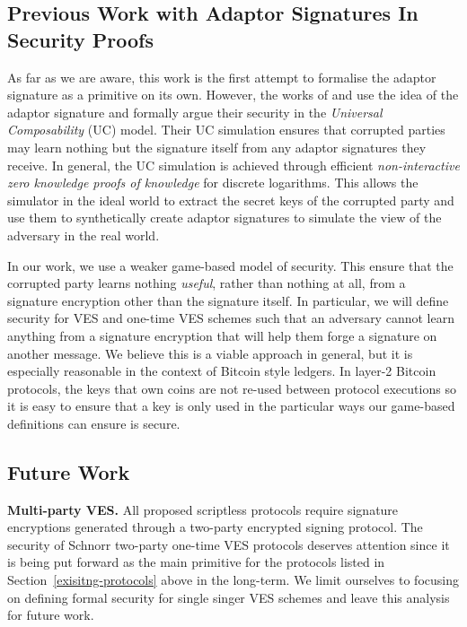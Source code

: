 \documentclass[fullpage]{article}
\theoremstyle{definition}
\begin{document}
\subsection{Previous Work with Adaptor Signatures In Security Proofs}

As far as we are aware, this work is the first attempt to formalise the adaptor signature as a primitive on its own. However, the works of \cite{cryptoeprint:2018:472} and \cite{cryptoeprint:2019:589} use the idea of the adaptor signature and formally argue their security in the \emph{Universal Composability} (UC) model\cite{UC}. Their UC simulation ensures that corrupted parties may learn nothing but the signature itself from any adaptor signatures they receive. In general, the UC simulation is achieved through efficient \emph{non-interactive zero knowledge proofs of knowledge} for discrete logarithms. This allows the simulator in the ideal world to extract the secret keys of the corrupted party and use them to synthetically create adaptor signatures to simulate the view of the adversary in the real world.

In our work, we use a weaker game-based model of security. This ensure that the corrupted party learns nothing \emph{useful}, rather than nothing at all, from a signature encryption other than the signature itself. In particular, we will define security for VES and one-time VES schemes such that an adversary cannot learn anything from a signature encryption that will help them forge a signature on another message. We believe this is a viable approach in general, but it is especially reasonable in the context of Bitcoin style ledgers. In layer-2 Bitcoin protocols, the keys that own coins are not re-used between protocol executions so it is easy to ensure that a key is only used in the particular ways our game-based definitions can ensure is secure.

\subsection{Future Work}

\textbf{Multi-party VES.} All proposed scriptless protocols require signature encryptions generated through a two-party encrypted signing protocol. The security of Schnorr two-party one-time VES protocols deserves attention since it is being put forward as the main primitive for the protocols listed in Section~\ref{exisitng-protocols} above in the long-term. We limit ourselves to focusing on defining formal security for single singer VES schemes and leave this analysis for future work.
\end{document}
